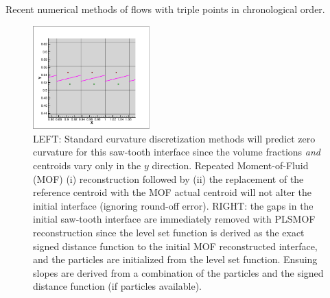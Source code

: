 \documentclass[]{article}
\begin{document}
\begin{table}[htbp]
\caption{Recent numerical methods of flows with triple points in 
  chronological order.  \label{tab:triple_point} }
\end{table}

\begin{figure}[htbp]
\centering
\includegraphics[width=0.4\textwidth]{checkerboardMOF.eps}
\caption{LEFT:
 Standard curvature discretization methods 
 \cite{sussman2003second,cummins2005estimating,REMMERSWAAL2022111473}
 will predict zero curvature for this saw-tooth
 interface since the volume fractions {\em and} 
 centroids vary only
 in the $y$ direction.  Repeated Moment-of-Fluid (MOF)
 (i) reconstruction followed by (ii) the replacement of the reference
 centroid with the MOF actual centroid will not alter the initial interface
 (ignoring round-off error).  RIGHT: the gaps in the initial saw-tooth 
 interface are immediately removed with PLSMOF reconstruction since the
 level set function is derived as the exact signed distance function to the
 initial MOF reconstructed interface, and the particles are initialized from
 the level set function.  Ensuing slopes
 are derived from a combination of the particles and the signed
 distance function (if particles available).
 \label{checkerboard} }
\end{figure}
\end{document}
